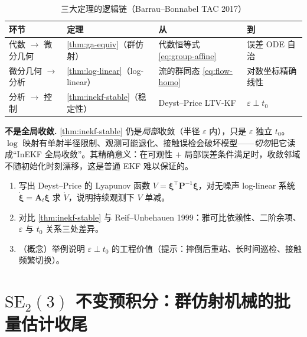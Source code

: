 \begin{table}[H]\centering\small
\caption{三大定理的逻辑链（Barrau--Bonnabel TAC 2017）}
\label{tab:three-theorems}
\begin{tabular}{llll}
\toprule
环节 & 定理 & 从 & 到 \\
\midrule
代数 $\to$ 微分几何 & \cref{thm:ga-equiv}（群仿射） & 代数恒等式 \cref{eq:group-affine} & 误差 ODE 自治 \\
微分几何 $\to$ 分析 & \cref{thm:log-linear}（log-linear） & 流的群同态 \cref{eq:flow-homo} & 对数坐标精确线性 \\
分析 $\to$ 控制 & \cref{thm:inekf-stable}（稳定性） & Deyst--Price LTV-KF & $\varepsilon\perp t_0$ \\
\bottomrule
\end{tabular}
\end{table}

\begin{note}
\textbf{不是全局收敛.}\;
\cref{thm:inekf-stable} 仍是\emph{局部}收敛（半径 $\varepsilon$ 内），只是 $\varepsilon$ 独立 $t_0$。$\log$ 映射有单射半径限制、观测可能退化、接触误检会破坏模型——\emph{切勿}把它读成“InEKF 全局收敛”。其精确意义：在可观性 $+$ 局部误差条件满足时，收敛邻域不随初始化时刻漂移，这是普通 EKF 难以保证的。
\end{note}

\begin{practice}
\begin{enumerate}
  \item 写出 Deyst--Price 的 Lyapunov 函数 $V=\boldsymbol{\xi}^\top\mathbf{P}^{-1}\boldsymbol{\xi}$，对无噪声 log-linear 系统 $\dot{\boldsymbol{\xi}}=\mathbf{A}_t\boldsymbol{\xi}$ 求 $\dot V$，说明持续观测下 $V$ 单减。
  \item 对比 \cref{thm:inekf-stable} 与 Reif--Unbehauen 1999：雅可比依赖性、二阶余项、$\varepsilon$ 与 $t_0$ 关系三处差异。
  \item （概念）举例说明 $\varepsilon\perp t_0$ 的工程价值（提示：摔倒后重站、长时间巡检、接触频繁切换）。
\end{enumerate}
\end{practice}

\section{\texorpdfstring{$\mathrm{SE}_2(3)$}{SE2(3)} 不变预积分：群仿射机械的批量估计收尾}
\label{sec:preint-se23}

